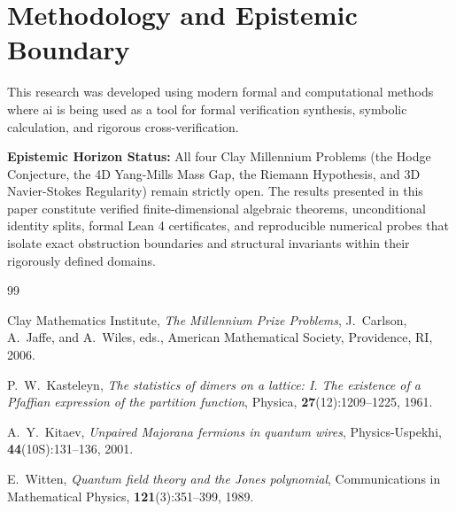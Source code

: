 \documentclass[11pt,a4paper]{article}
\theoremstyle{definition}
\begin{document}
\section{Methodology and Epistemic Boundary}
\noindent This research was developed using modern formal and computational methods where ai is being used as a tool for formal verification synthesis, symbolic calculation, and rigorous cross-verification.

\vspace{0.5em}
\noindent\textbf{Epistemic Horizon Status:} All four Clay Millennium Problems (the Hodge Conjecture, the 4D Yang-Mills Mass Gap, the Riemann Hypothesis, and 3D Navier-Stokes Regularity) remain strictly open. The results presented in this paper constitute verified finite-dimensional algebraic theorems, unconditional identity splits, formal Lean 4 certificates, and reproducible numerical probes that isolate exact obstruction boundaries and structural invariants within their rigorously defined domains.

\begin{thebibliography}{99}

Clay Mathematics Institute,
\textit{The Millennium Prize Problems},
J.~Carlson, A.~Jaffe, and A.~Wiles, eds.,
American Mathematical Society, Providence, RI, 2006.

P.~W.~Kasteleyn,
\textit{The statistics of dimers on a lattice: I. The existence of a Pfaffian expression of the partition function},
Physica, \textbf{27}(12):1209--1225, 1961.

A.~Y.~Kitaev,
\textit{Unpaired Majorana fermions in quantum wires},
Physics-Uspekhi, \textbf{44}(10S):131--136, 2001.

E.~Witten,
\textit{Quantum field theory and the Jones polynomial},
Communications in Mathematical Physics, \textbf{121}(3):351--399, 1989.

\end{thebibliography}
\end{document}
